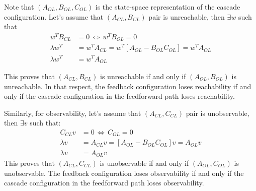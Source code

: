 \documentclass[twoside]{article}
\begin{document}
%
Note that $(A_{OL},B_{OL},C_{OL})$ is the state-space representation of the cascade configuration. 
Let's assume that $(A_{CL} , B_{CL})$ pair is unreachable, then $\exists w$ such that 
%
\begin{align*}
	w^T B_{CL} &= 0 \, \iff \, w^T B_{OL} = 0 
	\\
	\lambda w^T  &= w^T A_{CL} = w^T \left[ A_{OL} - B_{OL} C_{OL} \right] = w^T A_{OL}
	\\
	\lambda w^T &= w^T A_{OL}
\end{align*}
%
\begin{tcolorbox}[takeawaybox, title=Key Takeaway: Minimality in Feedback Loops]
This proves that $(A_{CL} , B_{CL})$ is unreachable if and only if $(A_{OL} , B_{OL})$ is unreachable. In that respect, the feedback configuration loses reachability if and only if the cascade configuration in the feedforward path loses reachability.

\vspace{2mm}
Similarly, for observability, let's assume that $(A_{CL} , C_{CL})$ pair is unobservable, then $\exists v$ such that:
\begin{align*}
	C_{CL} v &= 0 \, \iff \, C_{OL} = 0 \\
	\lambda v  &= A_{CL} v = \left[ A_{OL} - B_{OL} C_{OL} \right] v = A_{OL} v \\
	\lambda v &= A_{OL} v
\end{align*}
This proves that $(A_{CL} , C_{CL})$ is unobservable if and only if $(A_{OL} , C_{OL})$ is unobservable. The feedback configuration loses observability if and only if the cascade configuration in the feedforward path loses observability.
\end{tcolorbox}

\end{document}
